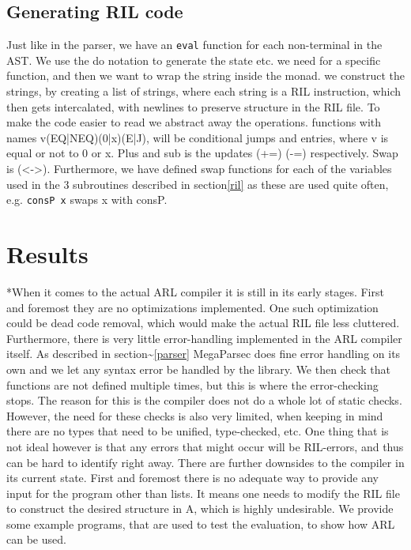 \documentclass[a4paper]{article}
\begin{document}
\subsection{Generating RIL code}
\label{sec:org10c8bd3}
Just like in the parser, we have an \texttt{eval} function for each non-terminal in the AST. We use the do notation to generate the state etc. we need for a specific function, and then we want to wrap the string inside the monad. we construct the strings, by creating a list of strings, where each string is a RIL instruction, which then gets intercalated, with newlines to preserve structure in the RIL file. To make the code easier to read we abstract away the operations. functions with names v(EQ|NEQ)(0|x)(E|J), will be conditional jumps and entries, where v is equal or not to 0 or x. Plus and sub is the updates (+=) (-=) respectively. Swap is (<->). Furthermore, we have defined swap functions for each of the variables used in the 3 subroutines described in section\ref{ril} as these are used quite often, e.g. \texttt{consP x} swaps x with consP.


\section{Results}
\label{sec:org4b98734}
*When it comes to the actual ARL compiler it is still in its early stages. First and foremost they are no optimizations implemented. One such optimization could be dead code removal, which would make the actual RIL file less cluttered. Furthermore, there is very little error-handling implemented in the ARL compiler itself. As described in section\textasciitilde{}\ref{parser} MegaParsec does fine error handling on its own and we let any syntax error be handled by the library. We then check that functions are not defined multiple times, but this is where the error-checking stops. The reason for this is the compiler does not do a whole lot of static checks. However, the need for these checks is also very limited, when keeping in mind there are no types that need to be unified, type-checked, etc. One thing that is not ideal however is that any errors that might occur will be RIL-errors, and thus can be hard to identify right away. There are further downsides to the compiler in its current state. First and foremost there is no adequate way to provide any input for the program other than lists. It means one needs to modify the RIL file to construct the desired structure in A, which is highly undesirable. We provide some example programs, that are used to test the evaluation, to show how ARL can be used.
\end{document}
